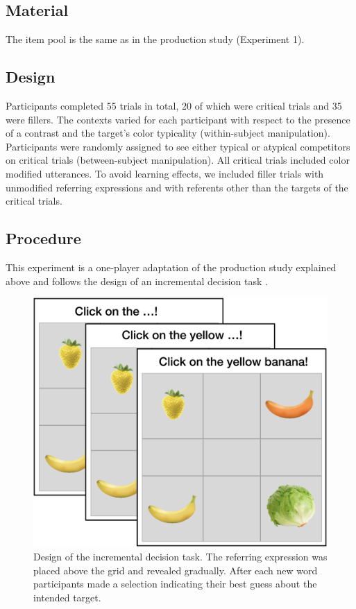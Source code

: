 \documentclass[10pt,letterpaper]{article}
\begin{document}
\subsection{Material}
The item pool is the same as in the production study (Experiment 1).


\subsection{Design}

Participants completed 55 trials in total, 20 of which were critical trials and 35 were fillers. The contexts varied for each participant with respect to the presence of a contrast and the target's color typicality (within-subject manipulation). Participants were randomly assigned to see either typical or atypical competitors on critical trials (between-subject manipulation). All critical trials included color modified utterances. 
To avoid learning effects, we included filler trials with unmodified referring expressions and with referents other than the targets of the critical trials. 



\subsection{Procedure}
This experiment is a one-player adaptation of the production study explained above and follows the design of an incremental decision task \cite{Qing:2018}. 

\begin{figure}
	\begin{center}
		\includegraphics[width=.325\textwidth]{graphs/IDT-design.pdf}
	\end{center}
\caption{Design of the incremental decision task. The referring expression was placed above the grid and revealed gradually. After each new word participants made a selection indicating their best guess about the intended target.} 
\label{prod-results}
\end{figure}
\end{document}
